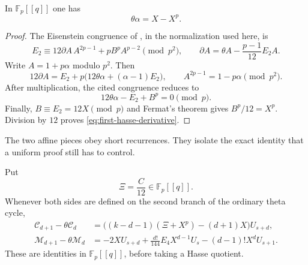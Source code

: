 \begin{lemma}
\label{lem:first-hasse-derivative}
In $\mathbb F_p[[q]]$ one has
\begin{equation}
\label{eq:first-hasse-derivative}
 \theta\alpha=X-X^p.
\end{equation}
\end{lemma}

\begin{proof}
The Eisenstein congruence of \cite[Theorem~1.2]{AHRR2026}, in the
normalization used here, is
\[
 E_2\equiv 12\partial A\,A^{2p-1}+pB^pA^{p-2}\pmod {p^2},
 \qquad
 \partial A=\theta A-\frac{p-1}{12}E_2A.
\]
Write $A=1+p\alpha$ modulo $p^2$.  Then
\[
 12\partial A
 =E_2+p\bigl(12\theta\alpha+(\alpha-1)E_2\bigr),
 \qquad
 A^{2p-1}=1-p\alpha
 \pmod {p^2}.
\]
After multiplication, the cited congruence reduces to
\[
 12\theta\alpha-E_2+B^p=0\pmod p.
\]
Finally, $B\equiv E_2=12X\pmod p$ and Fermat's theorem gives
$B^p/12=X^p$.  Division by $12$ proves
\eqref{eq:first-hasse-derivative}.
\end{proof}

The two affine pieces obey short recurrences.  They isolate the exact
identity that a uniform proof still has to control.

\begin{proposition}
\label{prop:factorial-affine-recurrences}
Put
\[
 \Xi=\frac C{12}\in\mathbb F_p[[q]].
\]
Whenever both sides are defined on the second branch of the ordinary
theta cycle,
\begin{align}
 \mathcal C_{d+1}-\theta\mathcal C_d
  &=\bigl((k-d-1)(\Xi+X^p)-(d+1)X\bigr)U_{s+d},
  \label{eq:C-affine-recurrence}\\
 \mathcal M_{d+1}-\theta\mathcal M_d
  &=-2X U_{s+d}
    +\frac{d!}{144}E_4X^{d-1}U_s
    -(d-1)!X^dU_{s+1}.
  \label{eq:M-affine-recurrence}
\end{align}
These are identities in $\mathbb F_p[[q]]$, before taking a Hasse
quotient.
\end{proposition}

